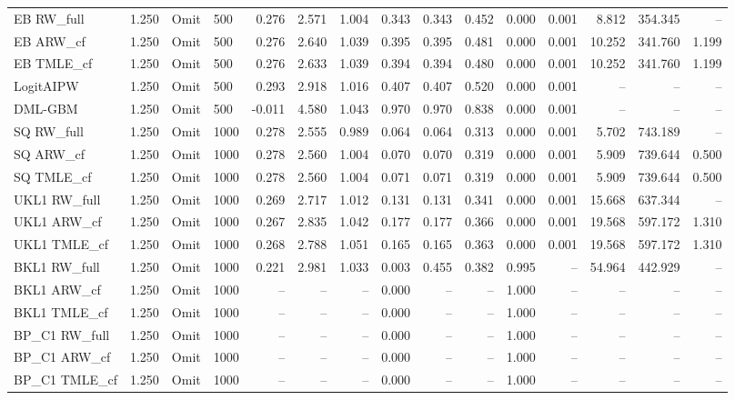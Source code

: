 \begin{tabular}{llllrrrrrrrrrrr}
EB RW\_full & 1.250 & Omit & 500 & 0.276 & 2.571 & 1.004 & 0.343 & 0.343 & 0.452 & 0.000 & 0.001 & 8.812 & 354.345 & -- \\
EB ARW\_cf & 1.250 & Omit & 500 & 0.276 & 2.640 & 1.039 & 0.395 & 0.395 & 0.481 & 0.000 & 0.001 & 10.252 & 341.760 & 1.199 \\
EB TMLE\_cf & 1.250 & Omit & 500 & 0.276 & 2.633 & 1.039 & 0.394 & 0.394 & 0.480 & 0.000 & 0.001 & 10.252 & 341.760 & 1.199 \\
LogitAIPW & 1.250 & Omit & 500 & 0.293 & 2.918 & 1.016 & 0.407 & 0.407 & 0.520 & 0.000 & 0.001 & -- & -- & -- \\
DML-GBM & 1.250 & Omit & 500 & -0.011 & 4.580 & 1.043 & 0.970 & 0.970 & 0.838 & 0.000 & 0.001 & -- & -- & -- \\
SQ RW\_full & 1.250 & Omit & 1000 & 0.278 & 2.555 & 0.989 & 0.064 & 0.064 & 0.313 & 0.000 & 0.001 & 5.702 & 743.189 & -- \\
SQ ARW\_cf & 1.250 & Omit & 1000 & 0.278 & 2.560 & 1.004 & 0.070 & 0.070 & 0.319 & 0.000 & 0.001 & 5.909 & 739.644 & 0.500 \\
SQ TMLE\_cf & 1.250 & Omit & 1000 & 0.278 & 2.560 & 1.004 & 0.071 & 0.071 & 0.319 & 0.000 & 0.001 & 5.909 & 739.644 & 0.500 \\
UKL1 RW\_full & 1.250 & Omit & 1000 & 0.269 & 2.717 & 1.012 & 0.131 & 0.131 & 0.341 & 0.000 & 0.001 & 15.668 & 637.344 & -- \\
UKL1 ARW\_cf & 1.250 & Omit & 1000 & 0.267 & 2.835 & 1.042 & 0.177 & 0.177 & 0.366 & 0.000 & 0.001 & 19.568 & 597.172 & 1.310 \\
UKL1 TMLE\_cf & 1.250 & Omit & 1000 & 0.268 & 2.788 & 1.051 & 0.165 & 0.165 & 0.363 & 0.000 & 0.001 & 19.568 & 597.172 & 1.310 \\
BKL1 RW\_full & 1.250 & Omit & 1000 & 0.221 & 2.981 & 1.033 & 0.003 & 0.455 & 0.382 & 0.995 & -- & 54.964 & 442.929 & -- \\
BKL1 ARW\_cf & 1.250 & Omit & 1000 & -- & -- & -- & 0.000 & -- & -- & 1.000 & -- & -- & -- & -- \\
BKL1 TMLE\_cf & 1.250 & Omit & 1000 & -- & -- & -- & 0.000 & -- & -- & 1.000 & -- & -- & -- & -- \\
BP\_C1 RW\_full & 1.250 & Omit & 1000 & -- & -- & -- & 0.000 & -- & -- & 1.000 & -- & -- & -- & -- \\
BP\_C1 ARW\_cf & 1.250 & Omit & 1000 & -- & -- & -- & 0.000 & -- & -- & 1.000 & -- & -- & -- & -- \\
BP\_C1 TMLE\_cf & 1.250 & Omit & 1000 & -- & -- & -- & 0.000 & -- & -- & 1.000 & -- & -- & -- & -- \\

\end{tabular}
